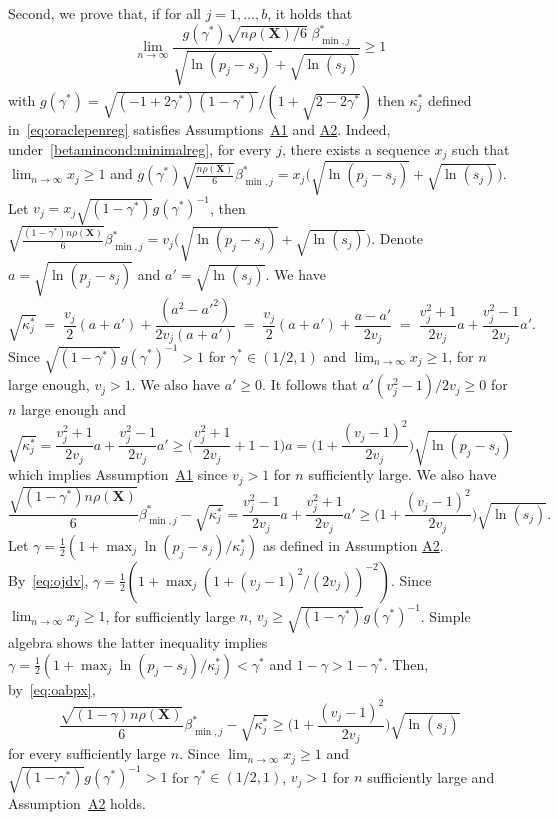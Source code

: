 \documentclass[
  12pt]{article}
\newcommand{\bX}{\mathbf{X}}
\begin{document}
Second, we prove that, if for all $j=1,\ldots,b$, it holds that
\begin{equation}\label{betamincond:minimalreg}
    \lim_{n\to \infty}\frac{g(\gamma^*)\sqrt{ n\rho(\bX)/6}\;\beta_{\min,j}^*}{\sqrt{\ln(p_j-s_j)} + \sqrt{\ln(s_j)}} \geq 1
\end{equation}
with $g(\gamma^*)=\sqrt{(-1 + 2 \gamma^*)(1-\gamma^*)}/(1 + \sqrt{2 - 2 \gamma^*})$ then $\kappa^*_j$ defined in~\eqref{eq:oraclepenreg} satisfies Assumptions~\hyperlink{lab:A1}{A1} and \hyperlink{lab:A2}{A2}. Indeed, under~\eqref{betamincond:minimalreg}, for every $j$, there exists a sequence $x_j$ such that $\lim_{n\to\infty} x_j\geq1$ and $g(\gamma^*)\sqrt{\frac{n\rho(\bX)}{6}}\beta^*_{\min,j}=x_j\big(\sqrt{\ln(p_j-s_j)} + \sqrt{\ln(s_j)}\big)$. Let $v_j= x_j \sqrt{(1-\gamma^*)}g(\gamma^*)^{-1}$, then $\sqrt{\frac{(1-\gamma^*)n\rho(\bX)}{6}}\beta^*_{\min,j}=v_j\big(\sqrt{\ln(p_j-s_j)} + \sqrt{\ln(s_j)}\big)$. Denote $a=\sqrt{\ln(p_j-s_j)}$ and $a'=\sqrt{\ln(s_j)}$.
We have
$$
\sqrt{\kappa^*_j} \;=\;\frac{v_j}{2} (a+a')+\frac{(a^2-a'^2)}{2v_j(a+a')}\;=\;\frac{v_j}{2} (a+a')+\frac{a-a'}{2v_j}\;=\;\frac{v_j^2+1}{2v_j}a+\frac{v_j^2-1}{2v_j}a'.
$$
Since $\sqrt{(1-\gamma^*)}g(\gamma^*)^{-1}>1$ for $\gamma^*\in(1/2,1)$ and $\lim_{n\to\infty} x_j\geq1$, for $n$ large enough, $v_j>1$. We also have $a'\geq 0$. It follows that $a'(v_j^2-1)/2v_j \geq 0$ for $n$ large enough and
\begin{equation}\label{eq:ojdv}
\sqrt{\kappa^*_j} =\frac{v_j^2+1}{2v_j}a+\frac{v_j^2-1}{2v_j}a'  \geq  \Big(\frac{v_j^2+1}{2v_j}+1-1\Big)a = \Big(1+\frac{(v_j-1)^2}{2v_j}\Big)\sqrt{\ln(p_j-s_j)} 
\end{equation}
which implies Assumption~\hyperlink{lab:A1}{A1} since $v_j>1$ for $n$ sufficiently large. We also have
\begin{equation}\label{eq:oabpx}
\frac{\sqrt{(1-\gamma^*) n\rho(\bX)}}{6}{\beta_{\min,j}^*}-\sqrt{\kappa^*_j} = \frac{v_j^2-1}{2v_j}a+\frac{v_j^2+1}{2v_j}a' \geq \Big(1+\frac{(v_j-1)^2}{2v_j}\Big)\sqrt{\ln(s_j)}.
\end{equation}
Let $\gamma = \tfrac12(1+\max_j\ln(p_j-s_j)/\kappa^*_j)$ as defined in Assumption \hyperlink{lab:A2}{A2}. By~\eqref{eq:ojdv}, $\gamma = \tfrac12(1+\max_j(1+(v_j-1)^2/(2v_j))^{-2})$. Since $\lim_{n\to\infty} x_j\geq 1$, for sufficiently large $n$, $v_j\geq \sqrt{(1-\gamma^*)}g(\gamma^*)^{-1}$. Simple algebra shows the latter inequality implies $\gamma=\tfrac12(1+\max_j\ln(p_j-s_j)/\kappa^*_j) < \gamma^*$ and $1-\gamma > 1-\gamma^*$. Then, by~\eqref{eq:oabpx}, 
\begin{equation*}
\frac{\sqrt{(1-\gamma) n\rho(\bX)}}{6}{\beta_{\min,j}^*}-\sqrt{\kappa^*_j} \geq \Big(1+\frac{(v_j-1)^2}{2v_j}\Big)\sqrt{\ln(s_j)}
\end{equation*}
for every sufficiently large $n$. Since $\lim_{n\to\infty} x_j\geq1$ and $\sqrt{(1-\gamma^*)}g(\gamma^*)^{-1}>1$ for $\gamma^*\in(1/2,1)$, $v_j>1$ for $n$ sufficiently large and  Assumption~\hyperlink{lab:A2}{A2} holds.
\end{document}
